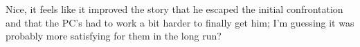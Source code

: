 Nice, it feels like it improved the story that he escaped the initial confrontation and that the PC's had to work a bit harder to finally get him; I'm guessing it was probably more satisfying for them in the long run?\\

